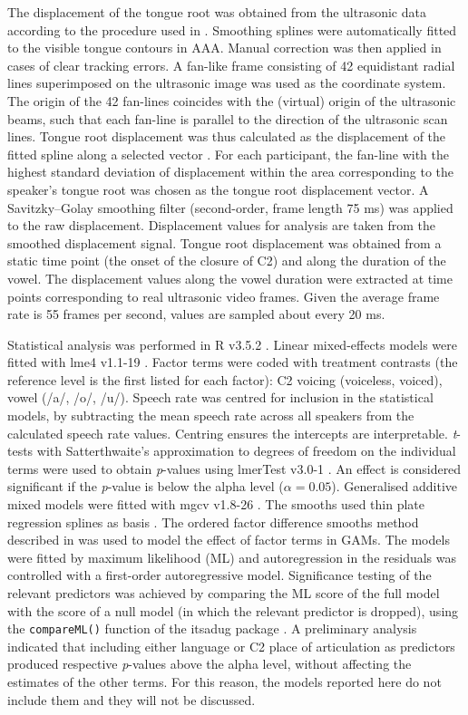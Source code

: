 \documentclass[12pt,]{article}
\begin{document}
The displacement of the tongue root was obtained from the ultrasonic
data according to the procedure used in \citet{kirkham2017}. Smoothing
splines were automatically fitted to the visible tongue contours in AAA.
Manual correction was then applied in cases of clear tracking errors. A
fan-like frame consisting of 42 equidistant radial lines superimposed on
the ultrasonic image was used as the coordinate system. The origin of
the 42 fan-lines coincides with the (virtual) origin of the ultrasonic
beams, such that each fan-line is parallel to the direction of the
ultrasonic scan lines. Tongue root displacement was thus calculated as
the displacement of the fitted spline along a selected vector
\citep{strycharczuk2015}. For each participant, the fan-line with the
highest standard deviation of displacement within the area corresponding
to the speaker's tongue root was chosen as the tongue root displacement
vector. A Savitzky--Golay smoothing filter (second-order, frame length
75 ms) was applied to the raw displacement. Displacement values for
analysis are taken from the smoothed displacement signal. Tongue root
displacement was obtained from a static time point (the onset of the
closure of C2) and along the duration of the vowel. The displacement
values along the vowel duration were extracted at time points
corresponding to real ultrasonic video frames. Given the average frame
rate is 55 frames per second, values are sampled about every 20 ms.

Statistical analysis was performed in R v3.5.2 \citep{r-core-team2018}.
Linear mixed-effects models were fitted with lme4 v1.1-19
\citep{bates2015}. Factor terms were coded with treatment contrasts (the
reference level is the first listed for each factor): C2 voicing
(voiceless, voiced), vowel (/a/, /o/, /u/). Speech rate was centred for
inclusion in the statistical models, by subtracting the mean speech rate
across all speakers from the calculated speech rate values. Centring
ensures the intercepts are interpretable. \emph{t}-tests with
Satterthwaite's approximation to degrees of freedom on the individual
terms were used to obtain \emph{p}-values using lmerTest v3.0-1
\citep{kuznetsova2017, luke2017}. An effect is considered significant if
the \emph{p}-value is below the alpha level (\(\alpha = 0.05\)).
Generalised additive mixed models were fitted with mgcv v1.8-26
\citep{wood2011, wood2017}. The smooths used thin plate regression
splines as basis \citep{wood2003}. The ordered factor difference smooths
method described in \citet{soskuthy2017, wieling2018} was used to model
the effect of factor terms in GAMs. The models were fitted by maximum
likelihood (ML) and autoregression in the residuals was controlled with
a first-order autoregressive model. Significance testing of the relevant
predictors was achieved by comparing the ML score of the full model with
the score of a null model (in which the relevant predictor is dropped),
using the \texttt{compareML()} function of the itsadug package
\citep{van-rij2017}. A preliminary analysis indicated that including
either language or C2 place of articulation as predictors produced
respective \emph{p}-values above the alpha level, without affecting the
estimates of the other terms. For this reason, the models reported here
do not include them and they will not be discussed.
\end{document}
